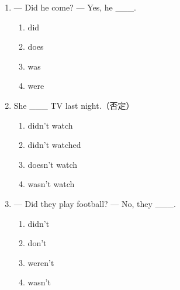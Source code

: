 \documentclass[11pt,a4paper]{ctexart}
\begin{document}
\begin{enumerate}[leftmargin=*,itemsep=4pt]
\begin{enumerate}[label=\Alph*.,leftmargin=2em,itemsep=1pt,topsep=2pt]
\item Were
\item Was
\end{enumerate}
\item — Did he come? — Yes, he \_\_\_.
\begin{enumerate}[label=\Alph*.,leftmargin=2em,itemsep=1pt,topsep=2pt]
\item did
\item does
\item was
\item were
\end{enumerate}
\item She \_\_\_ TV last night.（否定）
\begin{enumerate}[label=\Alph*.,leftmargin=2em,itemsep=1pt,topsep=2pt]
\item didn’t watch
\item didn’t watched
\item doesn’t watch
\item wasn’t watch
\end{enumerate}
\item — Did they play football? — No, they \_\_\_.
\begin{enumerate}[label=\Alph*.,leftmargin=2em,itemsep=1pt,topsep=2pt]
\item didn’t
\item don’t
\item weren’t
\item wasn’t
\end{enumerate}
\end{enumerate}
\end{document}
